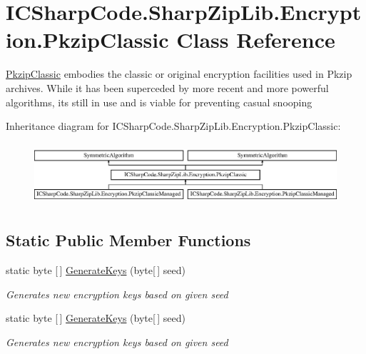 \hypertarget{class_i_c_sharp_code_1_1_sharp_zip_lib_1_1_encryption_1_1_pkzip_classic}{}\section{I\+C\+Sharp\+Code.\+Sharp\+Zip\+Lib.\+Encryption.\+Pkzip\+Classic Class Reference}
\label{class_i_c_sharp_code_1_1_sharp_zip_lib_1_1_encryption_1_1_pkzip_classic}


\hyperlink{class_i_c_sharp_code_1_1_sharp_zip_lib_1_1_encryption_1_1_pkzip_classic}{Pkzip\+Classic} embodies the classic or original encryption facilities used in Pkzip archives. While it has been superceded by more recent and more powerful algorithms, its still in use and is viable for preventing casual snooping  


Inheritance diagram for I\+C\+Sharp\+Code.\+Sharp\+Zip\+Lib.\+Encryption.\+Pkzip\+Classic\+:\begin{figure}[H]
\begin{center}
\leavevmode
\includegraphics[height=2.314050cm]{class_i_c_sharp_code_1_1_sharp_zip_lib_1_1_encryption_1_1_pkzip_classic}
\end{center}
\end{figure}
\subsection*{Static Public Member Functions}
\begin{DoxyCompactItemize}
\item 
static byte \mbox{[}$\,$\mbox{]} \hyperlink{class_i_c_sharp_code_1_1_sharp_zip_lib_1_1_encryption_1_1_pkzip_classic_ab155ffc8aff5a20b8d536f15de025993}{Generate\+Keys} (byte\mbox{[}$\,$\mbox{]} seed)
\begin{DoxyCompactList}\small\item\em Generates new encryption keys based on given seed \end{DoxyCompactList}\item 
static byte \mbox{[}$\,$\mbox{]} \hyperlink{class_i_c_sharp_code_1_1_sharp_zip_lib_1_1_encryption_1_1_pkzip_classic_ab155ffc8aff5a20b8d536f15de025993}{Generate\+Keys} (byte\mbox{[}$\,$\mbox{]} seed)
\begin{DoxyCompactList}\small\item\em Generates new encryption keys based on given seed \end{DoxyCompactList}\end{DoxyCompactItemize}


